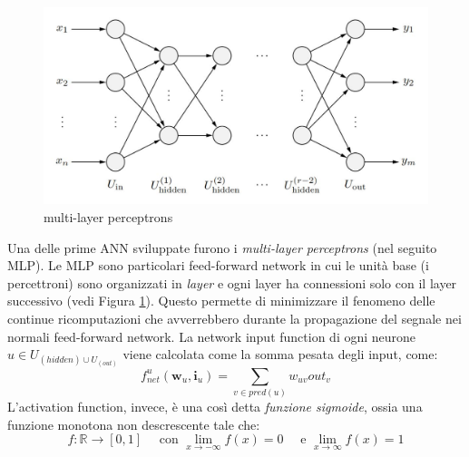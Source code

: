 \documentclass[10pt,a4paper]{article}
\newcommand{\ww}{\mathbf{w}}
\newcommand{\ii}{\mathbf{i}}
\begin{document}
\begin{figure}
\centering
\includegraphics[scale=0.3]{img/MLP.png}
\caption{multi-layer perceptrons}
\label{fig:9}
\end{figure}


Una delle prime ANN sviluppate furono i \emph{multi-layer perceptrons} (nel seguito MLP). Le MLP sono particolari feed-forward network  in cui le unità base (i percettroni) sono organizzati in \emph{layer} e ogni layer ha connessioni solo con il layer successivo (vedi Figura \ref{fig:9}). Questo permette di minimizzare il fenomeno delle continue ricomputazioni che avverrebbero durante la propagazione del segnale nei normali feed-forward network.
La network input function di ogni neurone $u \in U_{(hidden) \cup U_{(out)}}$ viene calcolata come la somma pesata degli input, come:
$$
f^u_{net}(\ww_u,\ii_u) = \sum_{v \in pred(u)} w_{uv}out_v
$$
L'activation function, invece, è una così detta \emph{funzione sigmoide}, ossia una funzione monotona non descrescente tale che:
$$
f: \mathbb{R} \to [0,1] \quad \text{ con } \lim_{x\to-\infty}f(x) = 0 \quad \text{ e } \lim_{x\to\infty}f(x) = 1
$$
\end{document}
